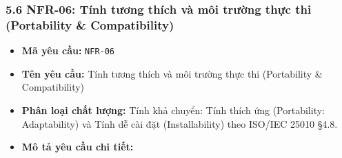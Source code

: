 \documentclass[11pt,a4paper]{article}
\providecommand{\tightlist}{
  \setlength{\itemsep}{0pt}\setlength{\parskip}{0pt}}
\begin{document}
\subsubsection{5.6 NFR-06: Tính tương thích và môi trường thực thi
(Portability \&
Compatibility)}\label{56-nfr-06-tuxednh-tux1b0ux1a1ng-thuxedch-vuxe0-muxf4i-trux1b0ux1eddng-thux1ef1c-thi-portability--compatibility}

\begin{itemize}
\tightlist
\item
  \textbf{Mã yêu cầu:} \texttt{NFR-06}
\item
  \textbf{Tên yêu cầu:} Tính tương thích và môi trường thực thi
  (Portability \& Compatibility)
\item
  \textbf{Phân loại chất lượng:} Tính khả chuyển: Tính thích ứng
  (Portability: Adaptability) và Tính dễ cài đặt (Installability) theo
  ISO/IEC 25010 §4.8.
\item
  \textbf{Mô tả yêu cầu chi tiết:}


\end{itemize}
\end{document}
